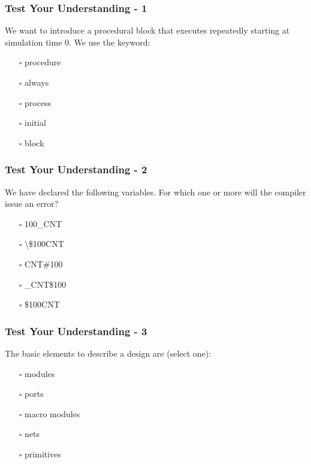 \documentclass[t, notes]{beamer}
\begin{document}
\begin{frame}
\frametitle{Test Your Understanding - 1}

We want to introduce a procedural block that executes repeatedly starting at simulation time 0. We use the keyword:
\begin{itemize}
\item[$\square$] procedure
\item[$\square$] always
\item[$\square$] process
\item[$\square$] initial
\item[$\square$] block
\end{itemize}

\end{frame}

\begin{frame}
\frametitle{Test Your Understanding - 2}

We have declared the following variables. For which one or more will the compiler issue an error?
\begin{itemize}
\item[$\square$] 100\_CNT
\item[$\square$] \textbackslash \$100CNT
\item[$\square$] CNT\#100
\item[$\square$] \_CNT\$100
\item[$\square$] \$100CNT
\end{itemize}

\end{frame}

\begin{frame}
\frametitle{Test Your Understanding - 3}

The basic elements to describe a design are (select one):
\begin{itemize}
\item[$\square$] modules
\item[$\square$] ports
\item[$\square$] macro modules
\item[$\square$] nets
\item[$\square$] primitives
\end{itemize}

\end{frame}
\end{document}
